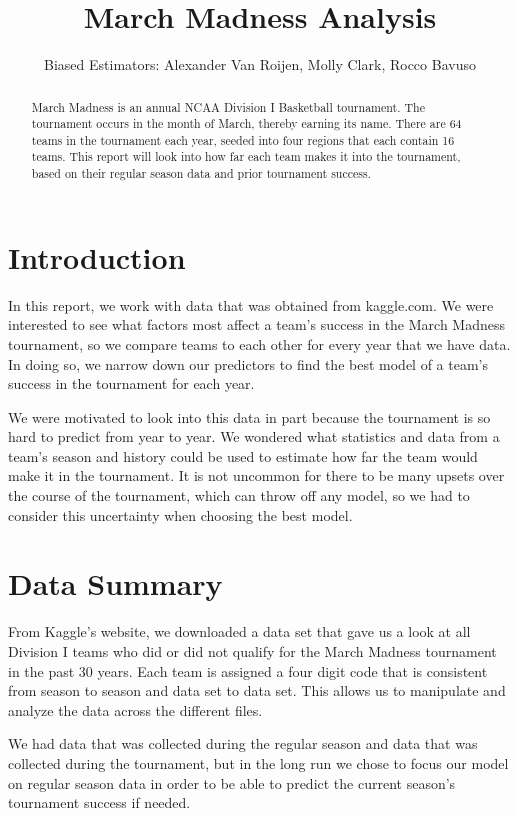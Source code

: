 \documentclass[]{scrartcl}
\title{March Madness Analysis}
\author{Biased Estimators: Alexander Van Roijen, Molly Clark, Rocco Bavuso}
\begin{document}
\maketitle

\begin{abstract}
\begin{center}
	\noindent March Madness is an annual NCAA Division I Basketball tournament. The tournament occurs in the month of March, thereby earning its name. There are 64 teams in the tournament each year, seeded into four regions that each contain 16 teams. This report will look into how far each team makes it into the tournament, based on their regular season data and prior tournament success.
\end{center}
\end{abstract}

\section*{Introduction}
\noindent In this report, we work with data that was obtained from kaggle.com. We were interested to see what factors most affect a team's success in the March Madness tournament, so we compare teams to each other for every year that we have data. In doing so, we narrow down our predictors to find the best model of a team's success in the tournament for each year.

\noindent We were motivated to look into this data in part because the tournament is so hard to predict from year to year. We wondered what statistics and data from a team's season and history could be used to estimate how far the team would make it in the tournament. It is not uncommon for there to be many upsets over the course of the tournament, which can throw off any model, so we had to consider this uncertainty when choosing the best model.
\section*{Data Summary}
From Kaggle's website, we downloaded a data set that gave us a look at all Division I teams who did or did not qualify for the March Madness tournament in the past 30 years. Each team is assigned a four digit code that is consistent from season to season and data set to data set. This allows us to manipulate and analyze the data across the different files.

We had data that was collected during the regular season and data that was collected during the tournament, but in the long run we chose to focus our model on regular season data in order to be able to predict the current season's tournament success if needed.
\end{document}
